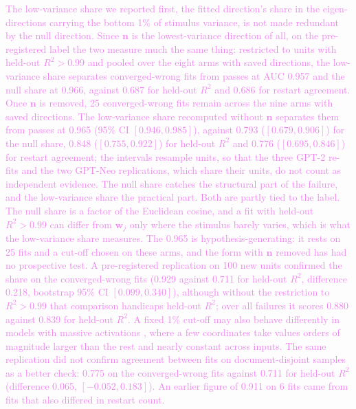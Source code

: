 \documentclass[10pt]{article}
\newcommand{\draft}[1]{\textcolor{violet}{#1}}
\begin{document}
\draft{The low-variance share we reported first, the fitted direction's share in the
eigen-directions carrying the bottom 1\% of stimulus variance, is not made redundant by the null
direction. Since $\mathbf{n}$ is the lowest-variance direction of all, on the pre-registered
label the two measure much the same thing: restricted to units with held-out $R^2 > 0.99$ and
pooled over the eight arms with saved directions, the low-variance share separates
converged-wrong fits from passes at AUC 0.957 and the null share at 0.966, against 0.687 for
held-out $R^2$ and 0.686 for restart agreement. Once $\mathbf{n}$ is removed, 25 converged-wrong
fits remain across the nine arms with saved directions. The low-variance share recomputed
without $\mathbf{n}$ separates them from passes at 0.965 (95\% CI $[0.946, 0.985]$), against 0.793
($[0.679, 0.906]$) for the null share, 0.848 ($[0.755, 0.922]$) for held-out $R^2$ and 0.776
($[0.695, 0.846]$) for restart agreement; the intervals resample units, so that the three GPT-2
re-fits and the two GPT-Neo replications, which share their units, do not count as independent
evidence. The null share catches the structural part of the failure, and the low-variance share
the practical part. Both are partly tied to the label. The null share is a factor of the
Euclidean cosine, and a fit with held-out $R^2 > 0.99$ can differ from $\mathbf{w}_j$ only where
the stimulus barely varies, which is what the low-variance share measures. The 0.965 is
hypothesis-generating: it rests on 25 fits and a cut-off chosen on these arms, and the form with
$\mathbf{n}$ removed has had no prospective test. A pre-registered replication on 100 new units
confirmed the share on the converged-wrong fits (0.929 against 0.711 for held-out $R^2$,
difference 0.218, bootstrap 95\% CI $[0.099, 0.340]$), although without the restriction to
$R^2 > 0.99$ that comparison handicaps held-out $R^2$; over all failures it scores 0.880 against
0.839 for held-out $R^2$. A fixed 1\% cut-off may also behave differently in models with massive activations
\citep{sun2024massive}, where a few coordinates take values orders of magnitude larger than the
rest and nearly constant across inputs. The same replication did not confirm agreement between
fits on document-disjoint samples as a better check: 0.775 on the converged-wrong fits against
0.711 for held-out $R^2$ (difference 0.065, $[-0.052, 0.183]$). An earlier figure of 0.911 on 6
fits came from fits that also differed in restart count.}

\begin{table}[t]
\centering
\scriptsize
\setlength{\tabcolsep}{3pt}

\caption{\draft{The layer-norm null direction, every arm with saved fitted directions. Each fit
and reference scored as filed (Euclidean cosine) and with $\mathbf{n} = 1/\gamma$ removed from
both (the identifiable label; removing it from the fit alone gives the same verdicts). $\Delta$
is AUC(restart agreement) minus AUC(held-out $R^2$); the interval is the stratified bootstrap of
the identifiable $\Delta$. --- where every fit fails on the filed label. The primary run and the
two depth arms saved no fitted directions; \bRReplicateNote.}}
\label{tab:lnnull}
\end{table}
\end{document}
